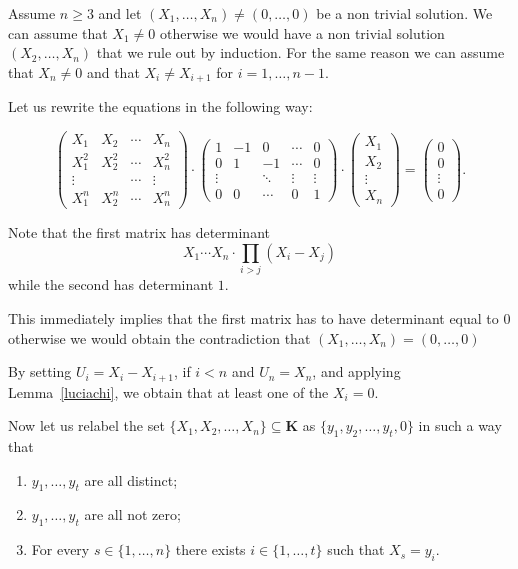 \documentclass[a4paper,twoside]{article}
\begin{document}
Assume $n\geq3$ and let $(X_1,\ldots,X_{n})\neq(0,\ldots,0)$ be
a non trivial solution. We can assume that $X_1\neq0$ otherwise
we would have a non trivial solution $(X_2,\ldots,X_{n})$
that we rule out by induction. For the same reason we can assume that
$X_n\neq0$ and that $X_i\neq X_{i+1}$ for $i=1,\ldots,n-1$.

Let us rewrite the equations in the following way:

$$\left(\begin{array}{cccc}
X_1 & X_2 & \cdots & X_n\\
X_1^2& X_2^2&\cdots & X_n^2\\
\vdots & &\cdots & \vdots\\
X_1^n & X_2^n & \cdots & X_n^n
\end{array}\right)\cdot\left(
\begin{array}{ccccc}1& -1 & 0 & \cdots & 0\\
                   0& 1 & -1 & \cdots & 0\\
                   \vdots & & \ddots  & \vdots & \vdots\\
                   0& 0 &\cdots & 0 & 1\end{array}
\right)\cdot\left(
\begin{array}{c}X_1\\X_2\\\vdots\\X_n\end{array}
\right)=
\left(\begin{array}{c}0\\0\\\vdots\\0\end{array}\right).$$

Note that the first matrix has determinant
$$X_1\cdots X_n\cdot\prod_{i>j}(X_i-X_j)$$
while the second has determinant $1$.

This immediately implies that the first matrix has to have
determinant equal to $0$ otherwise we would obtain the
contradiction  that $(X_1,\ldots,X_{n})=(0,\ldots,0)$

By setting $U_i=X_i-X_{i+1}$, if $i<n$ and $U_n=X_n$, and applying
Lemma~\ref{luciachi}, we obtain that at least one
of the $X_i=0$.

Now let us relabel the set $\{X_1,X_2,\ldots,X_n\}\subseteq\mathbf K$
as $\{y_1,y_2,\ldots,y_t,0\}$ in such a way that
\begin{enumerate}
\item $y_1,\ldots,y_t$ are all distinct;
\item $y_1,\ldots,y_t$ are all not zero;
\item For every $s\in\{1,\ldots,n\}$ there exists $i\in\{1,\ldots,t\}$ such
that $X_s=y_i$.
\end{enumerate}
\end{document}
